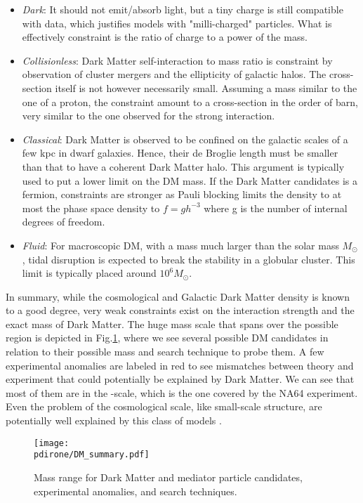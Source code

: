 \begin{itemize}
\item \textit{Dark}: It should not emit/absorb light, but a tiny charge is still compatible with data, which justifies models with "milli-charged" particles. What is effectively constraint is the ratio of charge to a power of the mass.
\item \textit{Collisionless}: Dark Matter self-interaction to mass ratio is constraint by observation of cluster mergers and the ellipticity of galactic halos. The cross-section itself is not however necessarily small. Assuming a mass similar to the one of a proton, the constraint amount to a cross-section in the order of barn, very similar to the one observed for the strong interaction.
\item \textit{Classical}: Dark Matter is observed to be confined on the galactic scales of a few kpc in dwarf galaxies. Hence, their de Broglie length must be smaller than that to have a coherent Dark Matter halo. This argument is typically used to put a lower limit on the DM mass. If the Dark Matter candidates is a fermion, constraints are stronger as Pauli blocking limits the density to at most the phase space density to $f=gh^{-3}$ where g is the number of internal degrees of freedom.
\item \textit{Fluid}: For macroscopic DM, with a mass much larger than the solar mass $M_{\odot}$, tidal disruption is expected to break the stability in a globular cluster. This limit is typically placed around $10^6 M_{\odot}$.
\end{itemize}

In summary, while the cosmological and Galactic Dark Matter density is known to a good degree, very weak constraints exist on the interaction strength and the exact mass of Dark Matter. The huge mass scale that spans over the possible region is depicted in Fig.\ref{fig:dm-mass-range}, where we see several possible DM candidates in relation to their possible mass and search technique to probe them. A few experimental anomalies are labeled in red to see mismatches between theory and experiment that could potentially be explained by Dark Matter. We can see that most of them are in the \mev-\gev scale, which is the one covered by the NA64 experiment. Even the problem of the cosmological scale, like small-scale structure, are potentially well explained by this class of models \cite{battaglieri2017cosmic}.

\begin{figure}[bht!]
  \centering
  \texttt{[image: \\pdirone/DM\_summary.pdf]}
  \caption[Mass range for Dark Matter]{Mass range for Dark Matter and mediator particle candidates, experimental anomalies, and search techniques.}
  \label{fig:dm-mass-range}
\end{figure}

